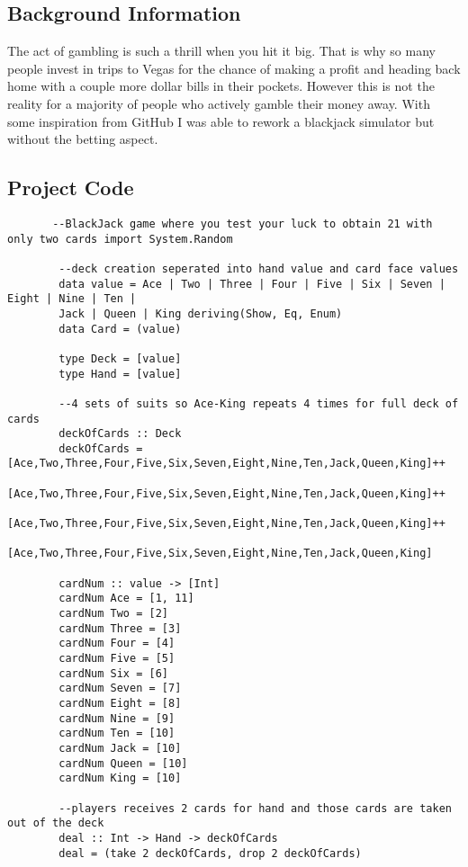 \documentclass{article}
\begin{document}
    \subsection{Background Information}
    The act of gambling is such a thrill when you hit it big. That is why so many people invest in trips to Vegas for the chance of making a profit and heading back home with a couple more dollar bills in their pockets. However this is not the reality for a majority of people who actively gamble their money away. With some inspiration from GitHub I was able to rework a blackjack simulator but without the betting aspect. 
    
    \subsection{Project Code}
    \begin{lstlisting}
       --BlackJack game where you test your luck to obtain 21 with only two cards import System.Random

        --deck creation seperated into hand value and card face values
        data value = Ace | Two | Three | Four | Five | Six | Seven | Eight | Nine | Ten |
        Jack | Queen | King deriving(Show, Eq, Enum)
        data Card = (value)

        type Deck = [value]
        type Hand = [value]
        
        --4 sets of suits so Ace-King repeats 4 times for full deck of cards
        deckOfCards :: Deck
        deckOfCards = [Ace,Two,Three,Four,Five,Six,Seven,Eight,Nine,Ten,Jack,Queen,King]++
                      [Ace,Two,Three,Four,Five,Six,Seven,Eight,Nine,Ten,Jack,Queen,King]++
                      [Ace,Two,Three,Four,Five,Six,Seven,Eight,Nine,Ten,Jack,Queen,King]++
                      [Ace,Two,Three,Four,Five,Six,Seven,Eight,Nine,Ten,Jack,Queen,King]
        
        cardNum :: value -> [Int]
        cardNum Ace = [1, 11]
        cardNum Two = [2]
        cardNum Three = [3]
        cardNum Four = [4]
        cardNum Five = [5]
        cardNum Six = [6]
        cardNum Seven = [7]
        cardNum Eight = [8]
        cardNum Nine = [9]
        cardNum Ten = [10]
        cardNum Jack = [10]
        cardNum Queen = [10]
        cardNum King = [10]
        
        --players receives 2 cards for hand and those cards are taken out of the deck
        deal :: Int -> Hand -> deckOfCards
        deal = (take 2 deckOfCards, drop 2 deckOfCards)
        

\end{lstlisting}
\end{document}
